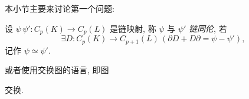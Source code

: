 本小节主要来讨论第一个问题:

\begin{Definition}[链同伦]
	设 $ \psi\,\psi' : C_p(K)\to C_p(L) $ 是链映射, 称 $ \psi $ 与 $ \psi' $ \emph{链同伦}, 若
	\[
		\exists D : C_p(K)\to C_{p+1}(L)\,(\partial D+D\partial=\psi-\psi'),
	\]
	记作 $ \psi\simeq\psi' $.
\end{Definition}

或者使用交换图的语言, 即图
\begin{center}
\end{center}
交换.

